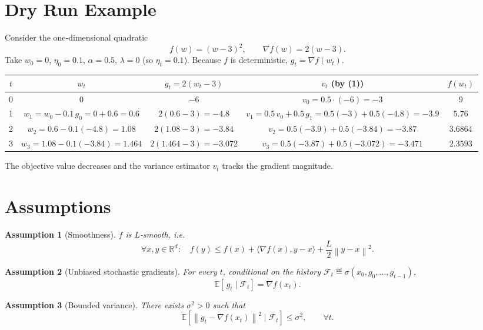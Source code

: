 \documentclass{article}
\newtheorem{assumption}{Assumption}
\newcommand{\E}{\mathbb{E}}
\newcommand{\R}{\mathbb{R}}
\newcommand{\norm}[1]{\left\|#1\right\|}
\newcommand{\ip}[2]{\langle #1,#2\rangle}
\newcommand{\grad}{\nabla}
\begin{document}
\section*{Dry Run Example}
Consider the one‑dimensional quadratic
\[
f(w)= (w-3)^{2},\qquad \grad f(w)=2(w-3) .
\]
Take $w_{0}=0$, $\eta_{0}=0.1$, $\alpha=0.5$, $\lambda=0$ (so $\eta_{t}=0.1$).  
Because $f$ is deterministic, $g_{t}= \grad f(w_{t})$.

\begin{center}
\begin{tabular}{c|c|c|c|c}
$t$ & $w_{t}$ & $g_{t}=2(w_{t}-3)$ & $v_{t}$ (by (1)) & $f(w_{t})$\\ \hline
0 & $0$ & $-6$ & $v_{0}=0.5\cdot(-6)=-3$ & $9$\\
1 & $w_{1}=w_{0}-0.1\,g_{0}=0+0.6=0.6$ & $2(0.6-3)=-4.8$ &
$v_{1}=0.5\,v_{0}+0.5\,g_{1}=0.5(-3)+0.5(-4.8)=-3.9$ & $5.76$\\
2 & $w_{2}=0.6-0.1(-4.8)=1.08$ & $2(1.08-3)=-3.84$ &
$v_{2}=0.5(-3.9)+0.5(-3.84)=-3.87$ & $3.6864$\\
3 & $w_{3}=1.08-0.1(-3.84)=1.464$ & $2(1.464-3)=-3.072$ &
$v_{3}=0.5(-3.87)+0.5(-3.072)=-3.471$ & $2.3593$
\end{tabular}
\end{center}
The objective value decreases and the variance estimator $v_{t}$ tracks the
gradient magnitude.

\newpage
\section*{Assumptions}
\begin{assumption}[Smoothness]\label{as:smooth}
$f$ is $L$‑smooth, i.e.
\[
\forall x,y\in\R^{d}:\quad 
f(y)\le f(x)+\ip{\grad f(x)}{y-x}+ \frac{L}{2}\norm{y-x}^{2}.
\tag{A1}
\]
\end{assumption}

\begin{assumption}[Unbiased stochastic gradients]\label{as:unbiased}
For every $t$, conditional on the history $\mathcal F_{t}\eqdef\sigma(x_{0},g_{0},\dots,g_{t-1})$,
\[
\E\!\left[\,g_{t}\mid\mathcal F_{t}\right]=\grad f(x_{t}).
\tag{A2}
\]
\end{assumption}

\begin{assumption}[Bounded variance]\label{as:variance}
There exists $\sigma^{2}>0$ such that
\[
\E\!\left[\norm{g_{t}-\grad f(x_{t})}^{2}\mid\mathcal F_{t}\right]\le\sigma^{2},
\qquad\forall t.
\tag{A3}
\]
\end{assumption}
\end{document}
